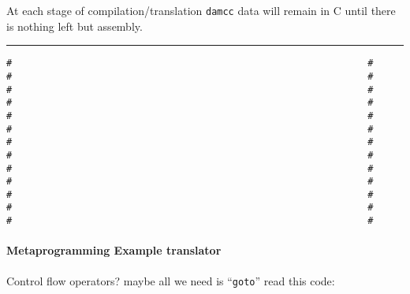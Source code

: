At each stage of compilation/translation \texttt{damcc} data will remain
in C until there is nothing left but assembly.

\begin{center}\rule{0.5\linewidth}{0.5pt}\end{center}

\begin{verbatim}
#                                                               #
#                                                               #
#                                                               #
#                                                               #
#                                                               #
#                                                               #
#                                                               #
#                                                               #
#                                                               #
#                                                               #
#                                                               #
#                                                               #
#                                                               #
\end{verbatim}

\hypertarget{metaprogramming-example-translator}{%
\paragraph{Metaprogramming Example
translator}\label{metaprogramming-example-translator}}

Control flow operators? maybe all we need is ``\texttt{goto}'' read this
code:

